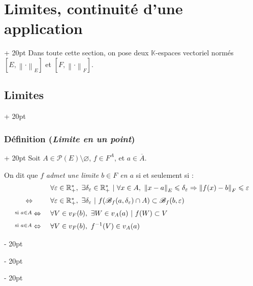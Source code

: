 \documentclass[a4paper, 12pt, twoside]{article}
\newcommand{\R}{\mathbb{R}} %
\newcommand{\K}{\mathbb K}
\newcommand{\cj}[1]{\overline{#1}} %
\newcommand{\lr}[1]{\left( #1 \right)}
\newcommand{\norm}[1]{\left\lVert #1 \right\rVert}
\newcommand{\ssi}{\ \Leftrightarrow \ }
\renewcommand{\le}{\leqslant}
\newcommand{\ind}[1][20pt]{\advance\leftskip + #1}
\newcommand{\deind}[1][20pt]{\advance\leftskip - #1}
\newenvironment{indt}[2][20pt]{#2 \par \ind[#1]}{\par \deind} %
\begin{document}
    \begin{indt}{\section{Limites, continuité d'une application}}
        Dans toute cette section, on pose deux $\K$-espaces vectoriel normés $[E, \norm \cdot _E]$ et $[F, \norm \cdot _F]$.

        \begin{indt}{\subsection{Limites}}
            \begin{indt}{\subsubsection{Définition (\textit{Limite en un point})}}
                Soit $A \in \mathcal P(E) \setminus \varnothing$, $f \in F^A$, et $a \in \cj A$.

                On dit que $f$ \emph{admet une limite $b \in F$ en $a$} si et seulement si :
                \[
                    \begin{array}{cl}
                        &
                        \forall \varepsilon \in \R^*_+,\
                        \exists \delta_\varepsilon \in \R^*_+\ |\
                        \forall x \in A,\
                        \norm{x - a}_E \le \delta_\varepsilon \Rightarrow \norm{f(x) - b}_F \le \varepsilon
                        \vspace{6pt}
                        \\
                        \ssi&
                        \forall \varepsilon \in \R^*_+,\
                        \exists \delta_\varepsilon\ |\
                        f\!\lr{\mathscr B_f(a, \delta_\varepsilon) \cap A} \subset \mathscr B_f(b, \varepsilon)
                        \vspace{6pt}
                        \\
                        \overset{\text{si } a \in A}\ssi&
                        \forall V \in v_F(b),\ \exists W \in v_A(a)\ |\ f(W) \subset V
                        \vspace{6pt}
                        \\
                        \overset{\text{si } a \in A}\ssi&
                        \forall V \in v_F(b),\ f^{-1}(V) \in v_A(a)
                    \end{array}
                \]


\end{indt}
\end{indt}
\end{indt}
\end{document}
